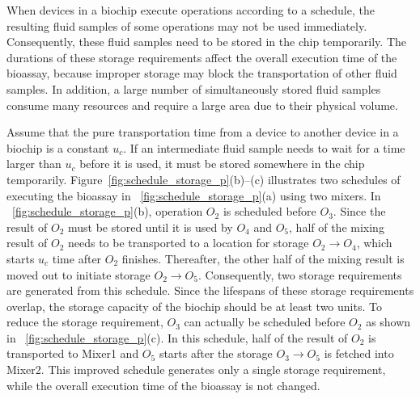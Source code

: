When devices in a biochip execute operations according to a schedule, the resulting
fluid samples of some operations may not be used immediately. 
Consequently, these fluid samples need to be stored in the chip temporarily. 
The durations of these storage requirements affect %
the overall execution time of the bioassay, because improper storage may block the
transportation of other fluid samples. In addition, a large number of
simultaneously stored fluid samples consume many resources and 
require a large area
due to their physical volume.

Assume that the pure transportation time from a device to another device 
in a biochip is a constant $u_c$. 
If an intermediate fluid sample needs to wait for a time larger than $u_c$ before
it is used, it must 
be stored somewhere in the chip temporarily. %
Figure~\ref{fig:schedule_storage_p}(b)--(c) illustrates
two schedules of executing the bioassay in \figname~\ref{fig:schedule_storage_p}(a)
using two mixers.
In \figname~\ref{fig:schedule_storage_p}(b),
operation $O_2$ is scheduled before $O_3$. 
Since the result of $O_2$ must be stored until it is used by $O_4$ and $O_5$, 
half of the mixing result of $O_2$ 
needs to be transported to a location for storage $O_2\to O_4$, which starts $u_c$
time after $O_2$ finishes.
Thereafter, the other half of the mixing result is %
moved out 
to initiate storage $O_2\to O_5$.
Consequently, two storage requirements are generated from this schedule. %
Since the lifespans of 
these storage requirements 
overlap, the storage capacity
of the biochip should be at least two units.
To reduce the storage requirement, $O_3$ can actually be scheduled before $O_2$ as
shown in \figname~\ref{fig:schedule_storage_p}(c). In this schedule, half of 
the result of $O_2$ is 
transported to Mixer1 and $O_5$ starts after the storage $O_3\to O_5$ is
fetched into Mixer2. This improved schedule generates
only a single storage requirement, %
while the overall execution time of the bioassay is not changed. 

